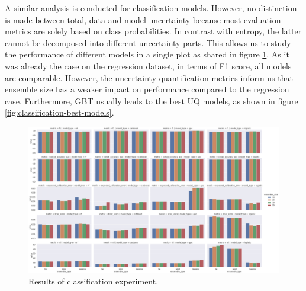 A similar analysis is conducted for classification models. However, no distinction is made between total, data and model uncertainty because most evaluation metrics are solely based on class probabilities. In contrast with entropy, the latter cannot be decomposed into different uncertainty parts. This allows us to study the performance of different models in a single plot as shared in figure \ref{fig:classification-results}. As it was already the case on the regression dataset, in terms of F1 score, all models are comparable. However, the uncertainty quantification metrics inform us that ensemble size has a weaker impact on performance compared to the regression case. Furthermore, GBT usually leads to the best UQ models, as shown in figure \ref{fig:classification-best-models}.




\begin{figure}[!htbp]
    \centering
    \includegraphics[width=1.1\linewidth]{figures/eval/uqlearn/classification-results.png}
    \caption{Results of classification experiment.}
    \label{fig:classification-results}
\end{figure}

